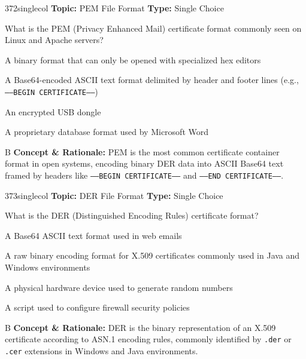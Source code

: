 \begin{qcard}{372}{singlecol}
\textcolor{darkslate!75}{\small\textbf{Topic:} PEM File Format \hfill \textbf{Type:} Single Choice}\vspace{0.4em}\par
What is the PEM (Privacy Enhanced Mail) certificate format commonly seen on Linux and Apache servers?
\begin{qoptions}
\item A binary format that can only be opened with specialized hex editors
\item A Base64-encoded ASCII text format delimited by header and footer lines (e.g., \texttt{-----BEGIN CERTIFICATE-----})
\item An encrypted USB dongle
\item A proprietary database format used by Microsoft Word
\end{qoptions}
\end{qcard}
\nopagebreak
\begin{explainbox}{B}
\textbf{Concept \& Rationale:} PEM is the most common certificate container format in open systems, encoding binary DER data into ASCII Base64 text framed by headers like \texttt{-----BEGIN CERTIFICATE-----} and \texttt{-----END CERTIFICATE-----}.
\end{explainbox}

\begin{qcard}{373}{singlecol}
\textcolor{darkslate!75}{\small\textbf{Topic:} DER File Format \hfill \textbf{Type:} Single Choice}\vspace{0.4em}\par
What is the DER (Distinguished Encoding Rules) certificate format?
\begin{qoptions}
\item A Base64 ASCII text format used in web emails
\item A raw binary encoding format for X.509 certificates commonly used in Java and Windows environments
\item A physical hardware device used to generate random numbers
\item A script used to configure firewall security policies
\end{qoptions}
\end{qcard}
\nopagebreak
\begin{explainbox}{B}
\textbf{Concept \& Rationale:} DER is the binary representation of an X.509 certificate according to ASN.1 encoding rules, commonly identified by \texttt{.der} or \texttt{.cer} extensions in Windows and Java environments.
\end{explainbox}


